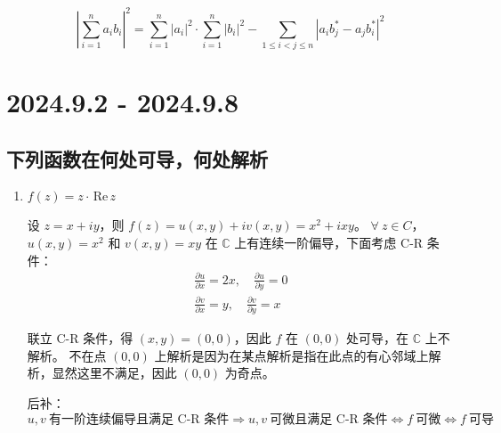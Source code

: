\documentclass[UTF8]{report}
\def\Re{\mathrm{\,Re\,}}
\def\C{\mathbb{C}}
\theoremstyle{MyLineTheoremStyle} %
\theoremstyle{MyBlockTheoremStyle} %
\theoremstyle{MySubsubsectionStyle} %
\begin{document}
\begin{equation*}
\left| \sum_{i=1}^{n} a_ib_i \right| ^2 
= \sum_{i=1}^{n} | a_i |^2 \cdot \sum_{i=1}^{n} | b_i |^2 - \sum_{1 \leqslant i <j \leqslant n} \left|  a_ib_j^* - a_jb_i^*  \right|^2  
\end{equation*}



\chapter{2024.9.2 - 2024.9.8}\thispagestyle{fancy}


\section{下列函数在何处可导，何处解析}
\begin{enumerate}
\item $ f(z) = z\cdot \Re z$

设 $z = x + iy$，则 $f(z) = u(x,y) + iv(x,y) = x^2 + ixy$。
$\forall\  z \in C$，$u(x,y) = x^2$ 和 $v(x,y) = xy$ 在 $\C$ 上有连续一阶偏导，下面考虑 C-R 条件：
\begin{gather}
\frac{\partial u }{\partial x } = 2x, \quad \frac{\partial u }{\partial y } = 0 \\ 
\frac{\partial v }{\partial x } = y, \quad \frac{\partial v }{\partial y } = x
\end{gather}

联立 C-R 条件，得 $(x,y) = (0,0)$，因此 $f$ 在 $(0,0)$ 处可导，在 $\C$ 上不解析。
不在点 $(0,0)$ 上解析是因为在某点解析是指在此点的有心邻域上解析，显然这里不满足，因此 $(0,0)$ 为奇点。


{\par\color{gray}\small
后补：
\begin{equation*}
u,v\ \text{有一阶连续偏导且满足 C-R 条件} \Longrightarrow  u,v\ \text{可微且满足 C-R 条件} \Longleftrightarrow f\ \text{可微} \Longleftrightarrow 
f\ \text{可导}
\end{equation*}
\par}




\end{enumerate}
\end{document}
